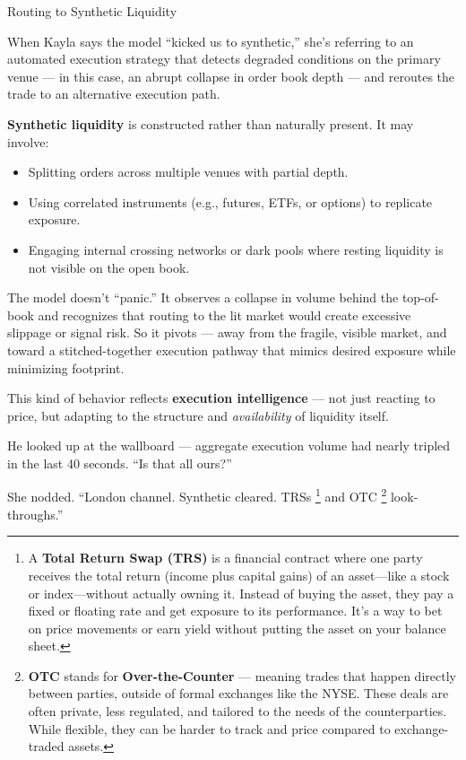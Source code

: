 \begin{TechnicalSidebar}{Routing to Synthetic Liquidity}

  When Kayla says the model “kicked us to synthetic,” she’s referring to an automated execution strategy that 
  detects degraded conditions on the primary venue — in this case, an abrupt collapse in order book depth — 
  and reroutes the trade to an alternative execution path.

  \medskip
  
  \textbf{Synthetic liquidity} is constructed rather than naturally present. It may involve:

  \medskip

  \begin{itemize}
    \item Splitting orders across multiple venues with partial depth.
    \item Using correlated instruments (e.g., futures, ETFs, or options) to replicate exposure.
    \item Engaging internal crossing networks or dark pools where resting liquidity is not visible on the open book.
  \end{itemize}
  
  \medskip
  
  The model doesn’t “panic.” It observes a collapse in volume behind the top-of-book and recognizes that 
  routing to the lit market would create excessive slippage or signal risk. So it pivots — away from the 
  fragile, visible market, and toward a stitched-together execution pathway that mimics desired exposure 
  while minimizing footprint.
  
  \medskip
  
  This kind of behavior reflects \textbf{execution intelligence} — not just reacting to price, but adapting 
  to the structure and \textit{availability} of liquidity itself.
  
\end{TechnicalSidebar}
  

He looked up at the wallboard — aggregate execution volume had nearly tripled in the last 40 seconds.
“Is that all ours?”

She nodded. “London channel. Synthetic cleared. TRSs
\footnote{A \textbf{Total Return Swap (TRS)} is a financial contract where one party receives the total return (income 
plus capital gains) of an asset—like a stock or index—without actually owning it. Instead of buying the asset, they pay 
a fixed or floating rate and get exposure to its performance. It's a way to bet on price movements or earn yield without 
putting the asset on your balance sheet.}
and OTC
\footnote{\textbf{OTC} stands for \textbf{Over-the-Counter} — meaning trades that happen directly between parties, outside 
of formal exchanges like the NYSE. These deals are often private, less regulated, and tailored to the needs of the 
counterparties. While flexible, they can be harder to track and price compared to exchange-traded assets.}
look-throughs.”

